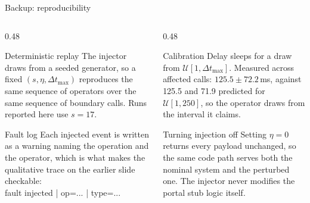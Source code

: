 \documentclass[aspectratio=169,10pt]{beamer}
\begin{document}
\begin{frame}[noframenumbering]{Backup: reproducibility}
  \begin{columns}[T]
    \begin{column}{0.48\textwidth}
      \begin{block}{Deterministic replay}
        \small The injector draws from a seeded generator, so a fixed $(s, \eta,
        \Delta t_{\max})$ reproduces the same sequence of operators over the same sequence of
        boundary calls. Runs reported here use $s = 17$.
      \end{block}
      \begin{block}{Fault log}
        \small Each injected event is written as a warning naming the operation and the
        operator, which is what makes the qualitative trace on the earlier slide checkable:\\[0.3em]
        {\scriptsize\ttfamily [WARN] fault injected | op=... | type=...}
      \end{block}
    \end{column}
    \begin{column}{0.48\textwidth}
      \begin{block}{Calibration}
        \small Delay sleeps for a draw from $\mathcal{U}[1, \Delta t_{\max}]$. Measured across
        affected calls: $125.5 \pm 72.2$\,ms, against 125.5 and 71.9 predicted for
        $\mathcal{U}[1,250]$, so the operator draws from the interval it claims.
      \end{block}
      \begin{block}{Turning injection off}
        \small Setting $\eta = 0$ returns every payload unchanged, so the same code path serves
        both the nominal system and the perturbed one. The injector never modifies the
        portal stub logic itself.
      \end{block}
    \end{column}
  \end{columns}
\end{frame}
\end{document}
